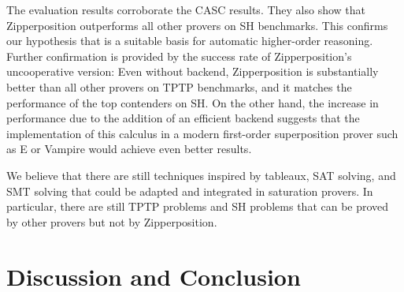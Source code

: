 
The evaluation results corroborate the CASC results. They also
show that Zipperposition outperforms all other provers on SH benchmarks. This
confirms our hypothesis that \osup{} is a suitable basis for automatic
higher-order reasoning. Further confirmation is provided by the success rate of
Zipperposition's uncooperative version: Even without backend,
Zipperposition is substantially better than all other provers on TPTP
benchmarks, and it matches the performance of the top contenders on SH.
On the other hand, the increase in performance due to the addition
of an efficient backend suggests that the implementation of this calculus in a
modern first-order superposition prover such as E or Vampire would achieve
even better results.

We believe that there are still techniques inspired by
tableaux, SAT solving, and SMT solving that could be adapted and integrated in
saturation provers. In particular, there are still  TPTP problems
and  SH problems that can be proved by other provers but not by
Zipperposition.

\section{Discussion and Conclusion}
\label{sec:ho-tech:discussion}



